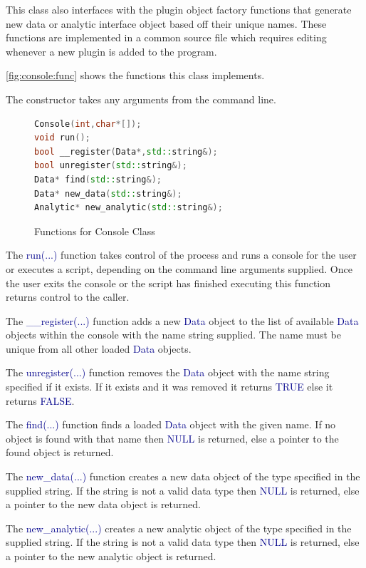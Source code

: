 \documentclass[10pt]{article}
\providecommand{\h}[1]{\textcolor{darkblue}{#1}}
\begin{document}
This class also interfaces with the plugin object factory functions that 
generate new data or analytic interface object based off their unique names. 
These functions are implemented in a common source file which requires editing 
whenever a new plugin is added to the program.

\autoref{fig:console:func} shows the functions this class implements.

The constructor takes any arguments from the command line.

\begin{figure}[H]
\begin{mdframed}[style=functions]
\begin{lstlisting}[language=C++]
Console(int,char*[]);
void run();
bool __register(Data*,std::string&);
bool unregister(std::string&);
Data* find(std::string&);
Data* new_data(std::string&);
Analytic* new_analytic(std::string&);
\end{lstlisting}
\end{mdframed}
\caption{Functions for Console Class}
\label{fig:console:func}
\end{figure}

The \h{run(...)} function takes control of the process and runs a console for 
the user or executes a script, depending on the command line arguments 
supplied. Once the user exits the console or the script has finished executing 
this function returns control to the caller.

The \h{\_\_register(...)} function adds a new \h{Data} object to the list of 
available \h{Data} objects within the console with the name string supplied. 
The name must be unique from all other loaded \h{Data} objects.

The \h{unregister(...)} function removes the \h{Data} object with the name 
string specified if it exists. If it exists and it was removed it returns 
\h{TRUE} else it returns \h{FALSE}.

The \h{find(...)} function finds a loaded \h{Data} object with the given name. 
If no object is found with that name then \h{NULL} is returned, else a 
pointer to the found object is returned.

The \h{new\_data(...)} function creates a new data object of the type 
specified in the supplied string. If the string is not a valid data type then 
\h{NULL} is returned, else a pointer to the new data object is returned.

The \h{new\_analytic(...)} creates a new analytic object of the type specified 
in the supplied string. If the string is not a valid data type then \h{NULL} is 
returned, else a pointer to the new analytic object is returned.
\end{document}
